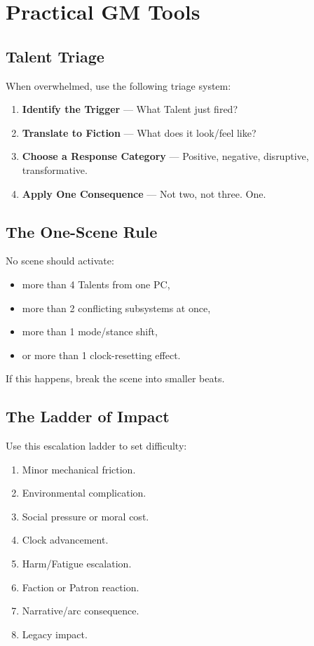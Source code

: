 \documentclass[11pt]{book}
\begin{document}
\section{Practical GM Tools}

\subsection{Talent Triage}

When overwhelmed, use the following triage system:

\begin{enumerate}
    \item \textbf{Identify the Trigger} --- What Talent just fired?
    \item \textbf{Translate to Fiction} --- What does it look/feel like?
    \item \textbf{Choose a Response Category} --- Positive, negative, disruptive, transformative.
    \item \textbf{Apply One Consequence} --- Not two, not three. One.
\end{enumerate}

\subsection{The One-Scene Rule}

No scene should activate:
\begin{itemize}
    \item more than 4 Talents from one PC,
    \item more than 2 conflicting subsystems at once,
    \item more than 1 mode/stance shift,
    \item or more than 1 clock-resetting effect.
\end{itemize}

If this happens, break the scene into smaller beats.

\subsection{The Ladder of Impact}

Use this escalation ladder to set difficulty:

\begin{enumerate}
    \item Minor mechanical friction.
    \item Environmental complication.
    \item Social pressure or moral cost.
    \item Clock advancement.
    \item Harm/Fatigue escalation.
    \item Faction or Patron reaction.
    \item Narrative/arc consequence.
    \item Legacy impact.
\end{enumerate}
\end{document}

